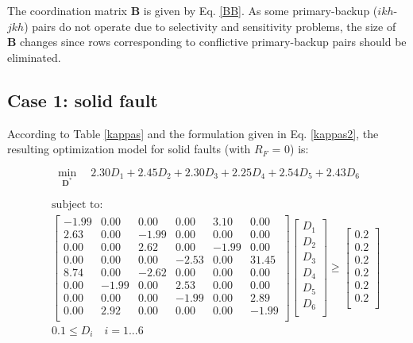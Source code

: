 \documentclass[letterpaper, 10 pt, conference]{IEEEtran}
\begin{document}
The coordination matrix $\mathbf{B}$ is given by Eq. \ref{BB}. As some primary-backup ($ikh$-$jkh$) pairs
 do not operate due to
selectivity and sensitivity problems, the size of $\mathbf{B}$ changes since  rows corresponding to conflictive
primary-backup pairs should be eliminated.


\subsection{Case 1: solid fault}\label{1}

 According to Table \ref{kappas} and the formulation given in Eq. \ref{kappas2}, the resulting optimization model for solid faults (with $R_F$ = 0) is:

\scriptsize
\begin{equation}\nonumber
   \min_{\mathbf{D^*}}\quad 2.30 D_1+2.45  D_2+2.30  D_3+2.25  D_4+ 2.54  D_5+2.43 D_6
\end{equation}

\begin{eqnarray}\nonumber
&&\mbox{subject to}:\\\nonumber
&&  \begin{bmatrix}
-1.99	&	0.00	&	0.00	&	0.00	&	3.10	&	0.00	\\
2.63	&	0.00	&	-1.99	&	0.00	&	0.00	&	0.00	\\
0.00	&	0.00	&	2.62	&	0.00	&	-1.99	&	0.00	\\
0.00	&	0.00	&	0.00	&	-2.53	&	0.00	&	31.45	\\
8.74	&	0.00	&	-2.62	&	0.00	&	0.00	&	0.00	\\
0.00	&	-1.99	&	0.00	&	2.53	&	0.00	&	0.00	\\
0.00	&	0.00	&	0.00	&	-1.99	&	0.00	&	2.89	\\
0.00	&	2.92	&	0.00	&	0.00	&	0.00	&	-1.99	\\
  \end{bmatrix}
  \begin{bmatrix} \nonumber
  D_1\\D_2\\D_3\\D_4\\D_5\\D_6\\
  \end{bmatrix}
\ge  \begin{bmatrix} \nonumber
  0.2\\0.2\\0.2\\0.2\\0.2\\0.2\\
  \end{bmatrix}\\\nonumber
& & 0.1\le{D_i}\quad i=1...6\\\nonumber
 \end{eqnarray}
\normalsize
\end{document}
